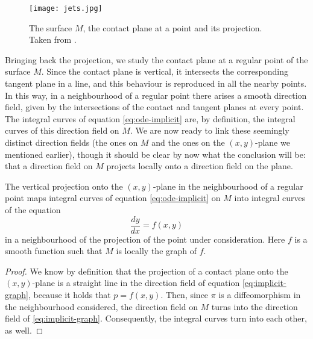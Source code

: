 \begin{figure}[h!]
\centering
\texttt{[image: jets.jpg]}
\caption{The surface $M$, the contact plane at a point and its projection. Taken from \cite{arnold2012geometrical}.}
\label{fig:jets}
\end{figure}

Bringing back the projection, we study the contact plane at a regular point of the surface $M$. Since the contact plane is vertical, it intersects the corresponding tangent plane in a line, and this behaviour is reproduced in all the nearby points. In this way, in a neighbourhood of a regular point there arises a smooth direction field, given by the intersections of the contact and tangent planes at every point. The integral curves of equation \eqref{eq:ode-implicit} are, by definition, the integral curves of this direction field on $M$. We are now ready to link these seemingly distinct direction fields (the ones on $M$ and the ones on the $(x,y)$-plane we mentioned earlier), though it should be clear by now what the conclusion will be: that a direction field on $M$ projects locally onto a direction field on the plane.

\begin{theorem}
  The vertical projection onto the $(x,y)$-plane in the neighbourhood of a regular point maps integral curves of equation \eqref{eq:ode-implicit} on $M$ into integral curves of the equation
  \begin{equation} \label{eq:implicit-graph}
      \frac{dy}{dx}=f(x,y)
  \end{equation}
  in a neighbourhood of the projection of the point under consideration. Here $f$ is a smooth function such that $M$ is locally the graph of $f$.
\end{theorem}

\begin{proof}
We know by definition that the projection of a contact plane onto the $(x,y)$-plane is a straight line in the direction field of equation \eqref{eq:implicit-graph}, because it holds that $p=f(x,y)$. Then, since $\pi$ is a diffeomorphism in the neighbourhood considered, the direction field on $M$ turns into the direction field of \eqref{eq:implicit-graph}. Consequently, the integral curves turn into each other, as well.
\end{proof}

